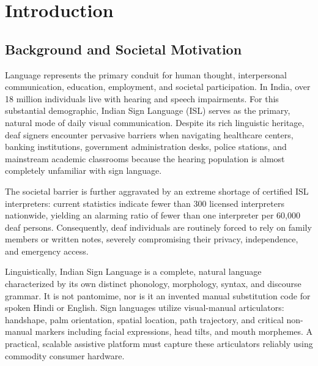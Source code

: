 
\chapter{Introduction}
\label{Chapter1}

\section{Background and Societal Motivation}
Language represents the primary conduit for human thought, interpersonal communication, education, employment, and societal participation. In India, over 18 million individuals live with hearing and speech impairments. For this substantial demographic, Indian Sign Language (ISL) serves as the primary, natural mode of daily visual communication. Despite its rich linguistic heritage, deaf signers encounter pervasive barriers when navigating healthcare centers, banking institutions, government administration desks, police stations, and mainstream academic classrooms because the hearing population is almost completely unfamiliar with sign language.

The societal barrier is further aggravated by an extreme shortage of certified ISL interpreters: current statistics indicate fewer than 300 licensed interpreters nationwide, yielding an alarming ratio of fewer than one interpreter per 60,000 deaf persons. Consequently, deaf individuals are routinely forced to rely on family members or written notes, severely compromising their privacy, independence, and emergency access.

Linguistically, Indian Sign Language is a complete, natural language characterized by its own distinct phonology, morphology, syntax, and discourse grammar. It is not pantomime, nor is it an invented manual substitution code for spoken Hindi or English. Sign languages utilize visual-manual articulators: handshape, palm orientation, spatial location, path trajectory, and critical non-manual markers including facial expressions, head tilts, and mouth morphemes. A practical, scalable assistive platform must capture these articulators reliably using commodity consumer hardware.

